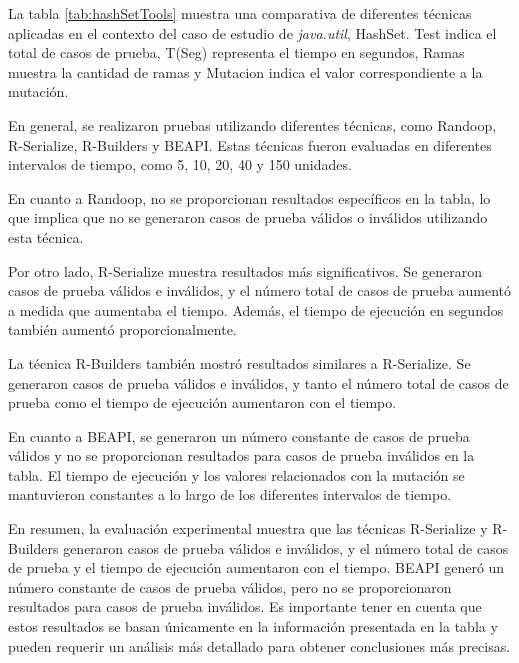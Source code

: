  
La tabla \ref{tab:hashSetTools} muestra una comparativa de diferentes técnicas aplicadas en el contexto del caso de estudio de \emph{java.util}, HashSet.
Test indica el total de casos de prueba, T(Seg) representa el tiempo en segundos, Ramas muestra la cantidad de ramas y Mutacion indica el valor correspondiente a la mutación.

En general, se realizaron pruebas utilizando diferentes técnicas, como Randoop, R-Serialize, R-Builders y BEAPI. Estas técnicas fueron evaluadas en diferentes intervalos de tiempo, como 5, 10, 20, 40 y 150 unidades.

En cuanto a Randoop, no se proporcionan resultados específicos en la tabla, lo que implica que no se generaron casos de prueba válidos o inválidos utilizando esta técnica.

Por otro lado, R-Serialize muestra resultados más significativos. Se generaron casos de prueba válidos e inválidos, y el número total de casos de prueba aumentó a medida que aumentaba el tiempo. Además, el tiempo de ejecución en segundos también aumentó proporcionalmente.

La técnica R-Builders también mostró resultados similares a R-Serialize. Se generaron casos de prueba válidos e inválidos, y tanto el número total de casos de prueba como el tiempo de ejecución aumentaron con el tiempo.

En cuanto a BEAPI, se generaron un número constante de casos de prueba válidos y no se proporcionan resultados para casos de prueba inválidos en la tabla. El tiempo de ejecución y los valores relacionados con la mutación se mantuvieron constantes a lo largo de los diferentes intervalos de tiempo.

En resumen, la evaluación experimental muestra que las técnicas R-Serialize y R-Builders generaron casos de prueba válidos e inválidos, y el número total de casos de prueba y el tiempo de ejecución aumentaron con el tiempo. BEAPI generó un número constante de casos de prueba válidos, pero no se proporcionaron resultados para casos de prueba inválidos. Es importante tener en cuenta que estos resultados se basan únicamente en la información presentada en la tabla y pueden requerir un análisis más detallado para obtener conclusiones más precisas.

